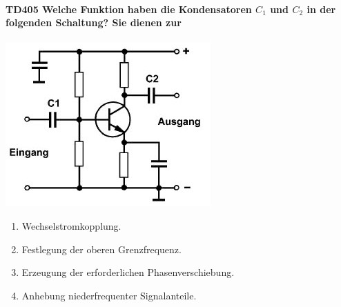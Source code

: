 \documentclass[8pt]{article}
\begin{document}
\begin{enumerate}
\begin{enumerate}[nolistsep,label=\Alph*]
\paragraph*{TD405 Welche Funktion haben die Kondensatoren $C_{1}$ und $C_{2}$ in der folgenden Schaltung? Sie dienen zur}
\begin{center}
	\begin{minipage}{\linewidth}
		\centering
		\includegraphics[scale=1.0]{pics/td405_a.jpg}
	\end{minipage}
\end{center}
\begin{enumerate}[nolistsep,label=\Alph*]
\item Wechselstromkopplung.
\item Festlegung der oberen Grenzfrequenz.
\item Erzeugung der erforderlichen Phasenverschiebung.
\item Anhebung niederfrequenter Signalanteile.
\end{enumerate}


\end{enumerate}
\end{enumerate}
\end{document}
